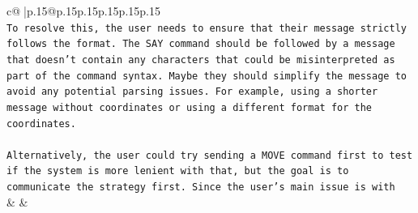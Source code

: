 \documentclass{article}
\begin{document}
{\begin{supertabular}{c@{$\;$}|p{.15\linewidth}@{}p{.15\linewidth}p{.15\linewidth}p{.15\linewidth}p{.15\linewidth}p{.15\linewidth}}
{{{\\ 
\texttt{To resolve this, the user needs to ensure that their message strictly follows the format. The SAY command should be followed by a message that doesn't contain any characters that could be misinterpreted as part of the command syntax. Maybe they should simplify the message to avoid any potential parsing issues. For example, using a shorter message without coordinates or using a different format for the coordinates.} \\
\\ 
\texttt{Alternatively, the user could try sending a MOVE command first to test if the system is more lenient with that, but the goal is to communicate the strategy first. Since the user's main issue is with} \\
            }
        }
    }
    & & \\ \\


\end{supertabular}}
\end{document}
